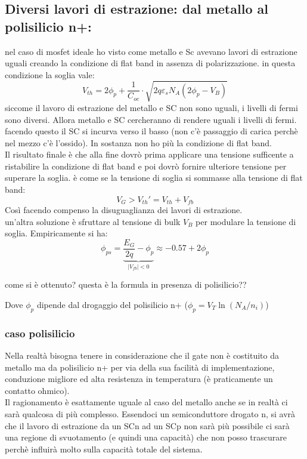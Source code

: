 \subsection{Diversi lavori di estrazione: dal metallo al polisilicio n+:}
%
nel caso di mosfet ideale ho visto come metallo e Sc avevano lavori di estrazione uguali creando la condizione di flat band in assenza di polarizzazione. in questa condizione la soglia vale:
\begin{equation}
    V_{th}= 2 \phi_p + \dfrac{1}{C_{oc}}\cdot \sqrt{2q\varepsilon_s N_A(2\phi_p -V_B)}
\end{equation}
 siccome il lavoro di estrazione del metallo e SC non sono uguali, i livelli di fermi sono diversi. Allora metallo e SC cercheranno di rendere uguali i livelli di fermi. facendo questo il SC si incurva verso il basso (non c'è passaggio di carica perchè nel mezzo c'è l'ossido). In sostanza non ho più la condizione di flat band.\\
 Il risultato finale è che alla fine dovrò prima applicare una tensione sufficente a ristabilire la condizione di flat band e poi dovrò fornire ulteriore tensione per superare la soglia. è come se la tensione di soglia si sommasse alla tensione di flat band:
 \begin{equation}
     V_G > V_{th}'=V_{th}+V_{fb}
 \end{equation}
 Così facendo compenso la disuguaglianza dei lavori di estrazione.\\
 un'altra soluzione è sfruttare al tensione di bulk $V_B$ per modulare la tensione di soglia. Empiricamente si ha:
 \begin{equation}
     \phi_{ps}=\underbrace{\dfrac{E_G}{2q}-\phi_p}_{|V_{fb}|<0} \approx -0.57 + 2\phi_p
 \end{equation}
 \begin{ricevimento}
     come si è ottenuto? questa è la formula in presenza di polisilicio??
 \end{ricevimento}
 Dove $\phi_p$ dipende dal drogaggio del polisilicio n+ ($\phi_p=V_T\ln{(N_A/n_i)}$)
%
\cleardoublepage
 \subsubsection{caso polisilicio}
 Nella realtà bisogna tenere in considerazione che il gate non è costituito da metallo ma da polisilicio n+ per via della sua facilità di implementazione, conduzione migliore ed alta resistenza in temperatura (è praticamente un contatto ohmico).\\
 Il ragionamento è esattamente uguale al caso del metallo anche se in realtà ci sarà qualcosa di più complesso. Essendoci un semiconduttore drogato n, si avrà che il lavoro di estrazione da un SCn ad un SCp non sarà più possibile ci sarà una regione di svuotamento (e quindi una capacità) che non posso trascurare perchè influirà molto sulla capacità totale del sistema.\\

